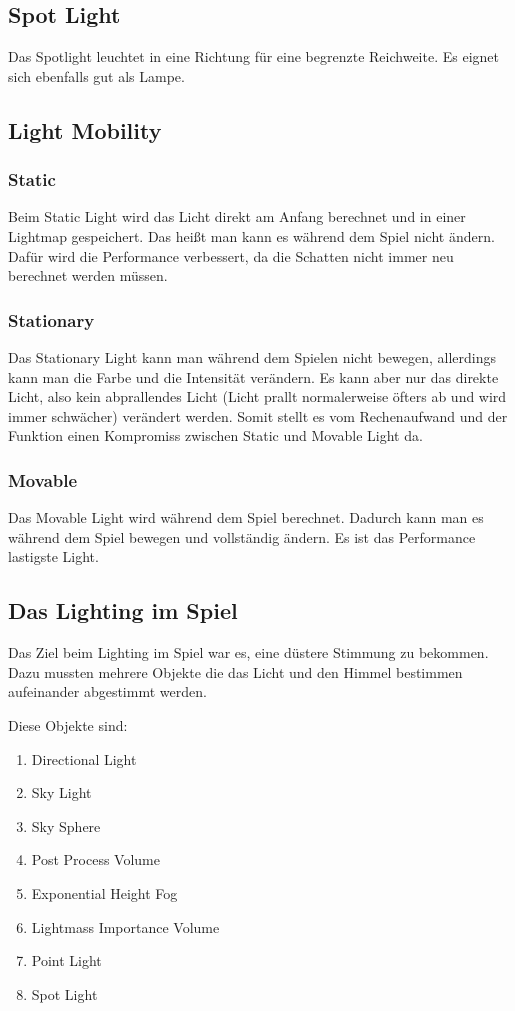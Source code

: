 \subsection{Spot Light}
Das Spotlight leuchtet in eine Richtung für eine begrenzte Reichweite. Es eignet sich ebenfalls gut als Lampe.

\subsection{Light Mobility}
\subsubsection{Static}
Beim Static Light wird das Licht direkt am Anfang berechnet und in einer Lightmap gespeichert. Das heißt man kann es während dem Spiel nicht ändern.
Dafür wird die Performance verbessert, da die Schatten nicht immer neu berechnet werden müssen. \citep{unreal:static_light}

\subsubsection{Stationary}
Das Stationary Light kann man während dem Spielen nicht bewegen, allerdings kann man die Farbe und die Intensität verändern. Es kann aber nur das direkte Licht, also kein
abprallendes Licht (Licht prallt normalerweise öfters ab und wird immer schwächer) verändert werden.
Somit stellt es vom Rechenaufwand und der Funktion einen Kompromiss zwischen Static und Movable Light da. \citep{unreal:stationary_light}

\subsubsection{Movable}
Das Movable Light wird während dem Spiel berechnet.
Dadurch kann man es während dem Spiel bewegen und vollständig ändern.
Es ist das Performance lastigste Light. \citep{unreal:movable_light}

\subsection{Das Lighting im Spiel}
Das Ziel beim Lighting im Spiel war es, eine düstere Stimmung zu bekommen. Dazu mussten mehrere Objekte die das Licht und den Himmel bestimmen aufeinander abgestimmt werden.

Diese Objekte sind:
\begin{enumerate}
    \item Directional Light
    \item Sky Light
    \item Sky Sphere
    \item Post Process Volume
    \item Exponential Height Fog
    \item Lightmass Importance Volume
    \item Point Light
    \item Spot Light
\end{enumerate}

